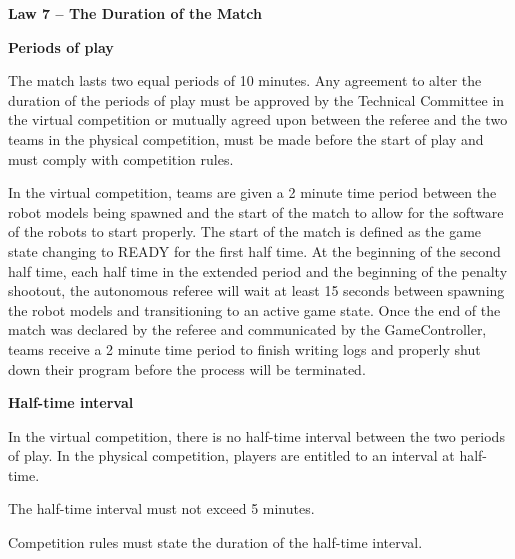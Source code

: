 \clearpage
\sffamily
{\bfseries\color[rgb]{0.4,0.4,0.4}
Law 7 -- The Duration of the Match}
{}

\bigskip

{\bfseries Periods of play }

\headlinebox

The match lasts two equal periods of 10 minutes.
Any agreement to alter the duration of the periods of play must be approved by the Technical Committee in the virtual competition or mutually agreed upon between the referee and the two teams in the physical competition, must be made before
the start of play and must comply with competition rules.


  In the virtual competition, teams are given a 2 minute time period between the robot models being spawned
  and the start of the match to allow for the software of the robots to start properly.
  The start of the match is defined as the game state changing to READY for the
  first half time.
  At the beginning of the second half time, each half time in the extended
  period and the beginning of the penalty shootout,
  the autonomous referee will wait at least 15 seconds between spawning the robot models
  and transitioning to an active game state.
  Once the end of the match was declared by the referee and communicated by the
  GameController,
  teams receive a 2 minute time period to finish writing logs and properly shut
  down their program before the process will be terminated.


\bigskip

{\bfseries Half-time interval}

\headlinebox

In the virtual competition, there is no half-time interval between the two periods of play.
In the physical competition, players are entitled to an interval at half-time.

The half-time interval must not exceed 5 minutes.

Competition rules must state the duration of the half-time interval.

